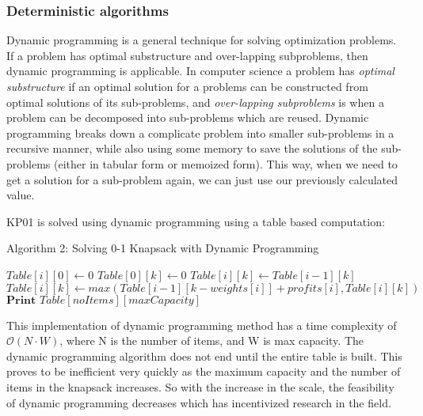 \documentclass[titlepage]{article}
\begin{document}
\subsubsection*{Deterministic algorithms}
Dynamic programming is a general technique for solving optimization problems. If a problem has optimal substructure and over-lapping subproblems, then dynamic programming is applicable. In computer science 
a problem has \emph{optimal substructure} if an optimal solution for a problems can be constructed from optimal solutions of its sub-problems, and \emph{over-lapping subproblems} is when a problem can be decomposed into sub-problems which are reused. Dynamic programming breaks down a complicate problem into smaller sub-problems in a recursive manner, while also using some memory to save the solutions of the sub-problems (either in tabular form or memoized form). This way, when we need to get a solution for a sub-problem again, we can just use our previously calculated value. 

KP01 is solved using dynamic programming using a table based computation:

\begin{algorithm}
\caption{Algorithm 2: Solving 0-1 Knapsack with Dynamic Programming}\label{dp}
    \begin{algorithmic}
         
            \State $Table[i][0] \gets 0 $ 
        \EndFor
         
            \State $Table[0][k] \gets 0 $
        \EndFor
                \State $Table[i][k] \gets Table[i-1][k]$  
                    \State $Table[i][k] \gets max(Table[i-1][k-weights[i]] + profits[i], Table[i][k]) $
                \EndIf
            \EndFor
        \EndFor
        \State $\textbf{Print } Table[noItems][maxCapacity] $
    \end{algorithmic}
\end{algorithm}

This implementation of dynamic programming method has a time complexity of $\mathcal{O}(N\cdot W)$, where N is the number of items, and W is max capacity. The dynamic programming algorithm does not end until the entire table is built. This proves to be inefficient very quickly as the maximum capacity and the number of items in the knapsack increases. So with the increase in the scale, the feasibility of dynamic programming decreases which has incentivized research in the field.
\end{document}
